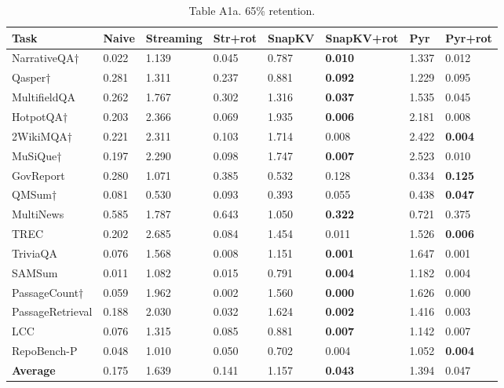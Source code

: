 \documentclass[10pt,letterpaper]{article}
\begin{document}
\begin{table}[H]
\centering
\small
\caption*{Table A1a. 65\% retention.}
\begin{tabular}{@{}llllllll@{}}
\toprule
Task & Naive & Streaming & Str+rot & SnapKV & SnapKV+rot & Pyr &
Pyr+rot\\
\midrule
NarrativeQA† & 0.022 & 1.139 & 0.045 & 0.787 & \textbf{0.010} & 1.337 & 0.012\\
Qasper† & 0.281 & 1.311 & 0.237 & 0.881 & \textbf{0.092} & 1.229 & 0.095\\
MultifieldQA & 0.262 & 1.767 & 0.302 & 1.316 & \textbf{0.037} & 1.535 & 0.045\\
HotpotQA† & 0.203 & 2.366 & 0.069 & 1.935 & \textbf{0.006} & 2.181 & 0.008\\
2WikiMQA† & 0.221 & 2.311 & 0.103 & 1.714 & 0.008 & 2.422 & \textbf{0.004}\\
MuSiQue† & 0.197 & 2.290 & 0.098 & 1.747 & \textbf{0.007} & 2.523 & 0.010\\
GovReport & 0.280 & 1.071 & 0.385 & 0.532 & 0.128 & 0.334 & \textbf{0.125}\\
QMSum† & 0.081 & 0.530 & 0.093 & 0.393 & 0.055 & 0.438 & \textbf{0.047}\\
MultiNews & 0.585 & 1.787 & 0.643 & 1.050 & \textbf{0.322} & 0.721 & 0.375\\
TREC & 0.202 & 2.685 & 0.084 & 1.454 & 0.011 & 1.526 & \textbf{0.006}\\
TriviaQA & 0.076 & 1.568 & 0.008 & 1.151 & \textbf{0.001} & 1.647 & 0.001\\
SAMSum & 0.011 & 1.082 & 0.015 & 0.791 & \textbf{0.004} & 1.182 & 0.004\\
PassageCount† & 0.059 & 1.962 & 0.002 & 1.560 & \textbf{0.000} & 1.626 & 0.000\\
PassageRetrieval & 0.188 & 2.030 & 0.032 & 1.624 & \textbf{0.002} & 1.416 & 0.003\\
LCC & 0.076 & 1.315 & 0.085 & 0.881 & \textbf{0.007} & 1.142 & 0.007\\
RepoBench-P & 0.048 & 1.010 & 0.050 & 0.702 & 0.004 & 1.052 & \textbf{0.004}\\
\textbf{Average} & 0.175 & 1.639 & 0.141 & 1.157 & \textbf{0.043} & 1.394 & 0.047\\
\bottomrule
\end{tabular}
\end{table}
\end{document}
